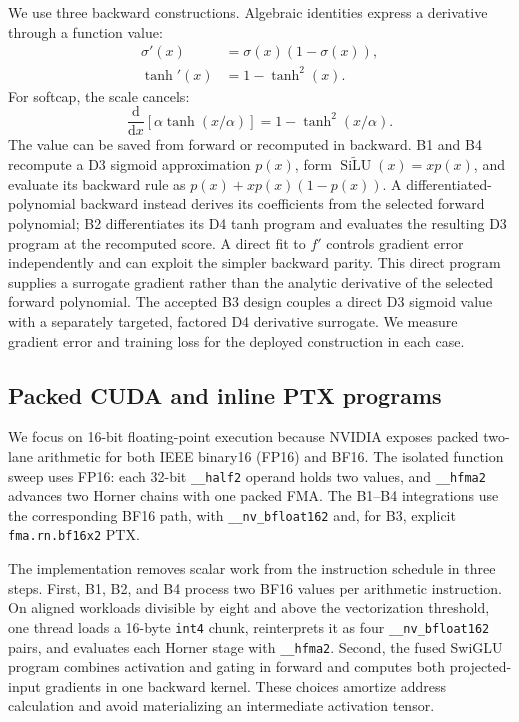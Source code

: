 \documentclass[11pt]{article}
\newcommand{\silu}{\operatorname{SiLU}}
\begin{document}
We use three backward constructions. Algebraic identities express a derivative
through a function value:
\begin{align}
    \sigma'(x) &= \sigma(x)(1-\sigma(x)), \\
    \tanh'(x) &= 1-\tanh^2(x).
\end{align}
For softcap, the scale cancels:
\begin{equation}
    \frac{\mathrm{d}}{\mathrm{d}x}
    \left[\alpha\tanh(x/\alpha)\right]
    =1-\tanh^2(x/\alpha).
    \label{eq:softcap-grad}
\end{equation}
The value can be saved from forward or recomputed in backward. B1 and B4
recompute a D3 sigmoid approximation $p(x)$, form
$\widetilde{\silu}(x)=xp(x)$, and evaluate its backward rule as
$p(x)+xp(x)(1-p(x))$. A differentiated-polynomial backward instead derives its
coefficients from the selected forward polynomial; B2 differentiates its D4
tanh program and evaluates the resulting D3 program at the recomputed score.
A direct fit to $f'$ controls gradient error independently and can exploit the
simpler backward parity. This direct program supplies a surrogate gradient
rather than the analytic derivative of the selected forward polynomial. The
accepted B3 design couples a direct D3 sigmoid value with a separately targeted,
factored D4 derivative surrogate. We measure gradient error and training loss
for the deployed construction in each case.

\subsection{Packed CUDA and inline PTX programs}

We focus on 16-bit floating-point execution because NVIDIA exposes packed
two-lane arithmetic for both IEEE binary16 (FP16) and BF16. The isolated
function sweep uses FP16: each 32-bit \texttt{\_\_half2} operand holds two
values, and \texttt{\_\_hfma2} advances two Horner chains with one packed FMA.
The B1--B4 integrations use the corresponding BF16 path, with
\texttt{\_\_nv\_bfloat162} and, for B3, explicit
\texttt{fma.rn.bf16x2} PTX.

The implementation removes scalar work from the instruction schedule in three
steps. First, B1, B2, and B4 process two BF16 values per arithmetic instruction.
On aligned workloads divisible by eight and above the vectorization threshold,
one thread loads a 16-byte \texttt{int4} chunk, reinterprets it as four
\texttt{\_\_nv\_bfloat162} pairs, and evaluates each Horner stage with
\texttt{\_\_hfma2}. Second, the fused SwiGLU program combines activation and
gating in forward and computes both projected-input gradients in one backward
kernel. These choices amortize address calculation and avoid materializing an
intermediate activation tensor.
\end{document}
